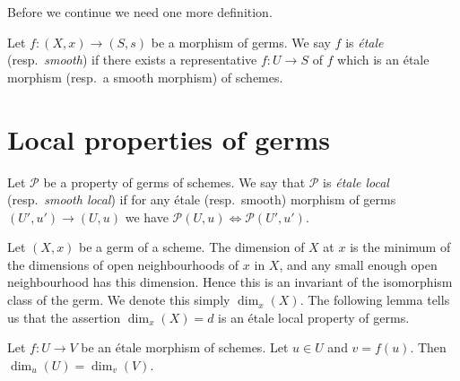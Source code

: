 \noindent
Before we continue we need one more definition.

\begin{definition}
\label{definition-etale-morphism-germs}
Let $f : (X, x) \to (S, s)$ be a morphism of germs.
We say $f$ is {\it \'etale} (resp.\ {\it smooth}) if there exists a
representative $f : U \to S$ of $f$ which is an \'etale morphism
(resp.\ a smooth morphism) of schemes.
\end{definition}








\section{Local properties of germs}
\label{section-properties-germs-local}

\begin{definition}
\label{definition-local-at-point}
Let $\mathcal{P}$ be a property of germs of schemes.
We say that $\mathcal{P}$ is {\it \'etale local}
(resp.\ {\it smooth local}) if for any
\'etale (resp.\ smooth) morphism of germs $(U', u') \to (U, u)$
we have $\mathcal{P}(U, u) \Leftrightarrow \mathcal{P}(U', u')$.
\end{definition}

\noindent
Let $(X, x)$ be a germ of a scheme.
The dimension of $X$ at $x$ is the minimum of the dimensions of
open neighbourhoods of $x$ in $X$, and any small enough open neighbourhood
has this dimension. Hence this is an invariant of the isomorphism class
of the germ. We denote this simply $\dim_x(X)$.
The following lemma tells us that the assertion
$\dim_x(X) = d$ is an \'etale local property of germs.

\begin{lemma}
\label{lemma-dimension-at-point-local}
Let $f : U \to V$ be an \'etale morphism of schemes.
Let $u \in U$ and $v = f(u)$. Then $\dim_u(U) = \dim_v(V)$.
\end{lemma}

